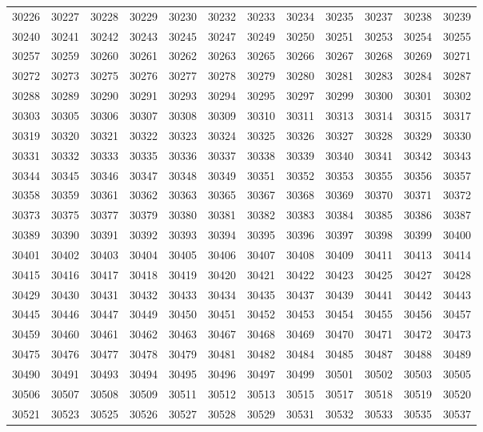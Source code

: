 \begin{center}
\begin{longtable}{llllllllllll}
30226 &30227 &30228 &30229 &30230 &30232 &30233 &30234 &30235 &30237 &30238 &30239 \\
30240 &30241 &30242 &30243 &30245 &30247 &30249 &30250 &30251 &30253 &30254 &30255 \\
30257 &30259 &30260 &30261 &30262 &30263 &30265 &30266 &30267 &30268 &30269 &30271 \\
30272 &30273 &30275 &30276 &30277 &30278 &30279 &30280 &30281 &30283 &30284 &30287 \\
30288 &30289 &30290 &30291 &30293 &30294 &30295 &30297 &30299 &30300 &30301 &30302 \\
30303 &30305 &30306 &30307 &30308 &30309 &30310 &30311 &30313 &30314 &30315 &30317 \\
30319 &30320 &30321 &30322 &30323 &30324 &30325 &30326 &30327 &30328 &30329 &30330 \\
30331 &30332 &30333 &30335 &30336 &30337 &30338 &30339 &30340 &30341 &30342 &30343 \\
30344 &30345 &30346 &30347 &30348 &30349 &30351 &30352 &30353 &30355 &30356 &30357 \\
30358 &30359 &30361 &30362 &30363 &30365 &30367 &30368 &30369 &30370 &30371 &30372 \\
30373 &30375 &30377 &30379 &30380 &30381 &30382 &30383 &30384 &30385 &30386 &30387 \\
30389 &30390 &30391 &30392 &30393 &30394 &30395 &30396 &30397 &30398 &30399 &30400 \\
30401 &30402 &30403 &30404 &30405 &30406 &30407 &30408 &30409 &30411 &30413 &30414 \\
30415 &30416 &30417 &30418 &30419 &30420 &30421 &30422 &30423 &30425 &30427 &30428 \\
30429 &30430 &30431 &30432 &30433 &30434 &30435 &30437 &30439 &30441 &30442 &30443 \\
30445 &30446 &30447 &30449 &30450 &30451 &30452 &30453 &30454 &30455 &30456 &30457 \\
30459 &30460 &30461 &30462 &30463 &30467 &30468 &30469 &30470 &30471 &30472 &30473 \\
30475 &30476 &30477 &30478 &30479 &30481 &30482 &30484 &30485 &30487 &30488 &30489 \\
30490 &30491 &30493 &30494 &30495 &30496 &30497 &30499 &30501 &30502 &30503 &30505 \\
30506 &30507 &30508 &30509 &30511 &30512 &30513 &30515 &30517 &30518 &30519 &30520 \\
30521 &30523 &30525 &30526 &30527 &30528 &30529 &30531 &30532 &30533 &30535 &30537 \\

\end{longtable}
\end{center}
